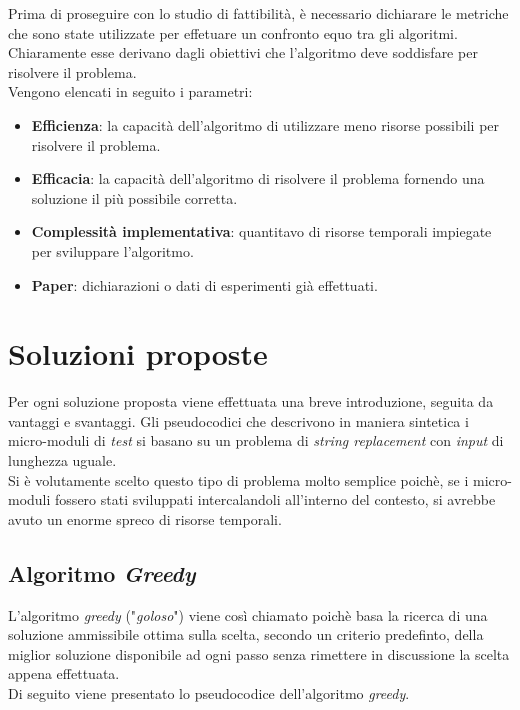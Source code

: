 \noindent Prima di proseguire con lo studio di fattibilità, è necessario dichiarare le metriche che sono state
utilizzate per effetuare un confronto equo tra gli algoritmi. Chiaramente esse derivano dagli obiettivi che
l'algoritmo deve soddisfare per risolvere il problema.\\
Vengono elencati in seguito i parametri:
\begin{itemize}
    \item \textbf{Efficienza}: la capacità dell'algoritmo di utilizzare meno risorse possibili per risolvere il problema.
    \item \textbf{Efficacia}: la capacità dell'algoritmo di risolvere il problema fornendo una soluzione il più possibile corretta.
    \item \textbf{Complessità implementativa}: quantitavo di risorse temporali impiegate per sviluppare l'algoritmo.
    \item \textbf{Paper}: dichiarazioni o dati di esperimenti già effettuati.
\end{itemize}


\section{Soluzioni proposte}
\noindent Per ogni soluzione proposta viene effettuata una breve introduzione, seguita da vantaggi e svantaggi.
Gli pseudocodici che descrivono in maniera sintetica i micro-moduli di \textit{test} si basano su un problema di \textit{string replacement}
con \textit{input} di lunghezza uguale.\\
Si è volutamente scelto questo tipo di problema molto semplice poichè, se i micro-moduli fossero stati sviluppati intercalandoli all'interno del contesto,
si avrebbe avuto un enorme spreco di risorse temporali.

\subsection{Algoritmo \textit{Greedy}}
\noindent L'algoritmo \textit{greedy} ("\textit{goloso}") viene così chiamato poichè basa la ricerca di una
soluzione ammissibile ottima sulla scelta, secondo un criterio predefinto, della miglior soluzione disponibile ad ogni passo senza
rimettere in discussione la scelta appena effettuata.\\
Di seguito viene presentato lo pseudocodice dell'algoritmo \textit{greedy}.

